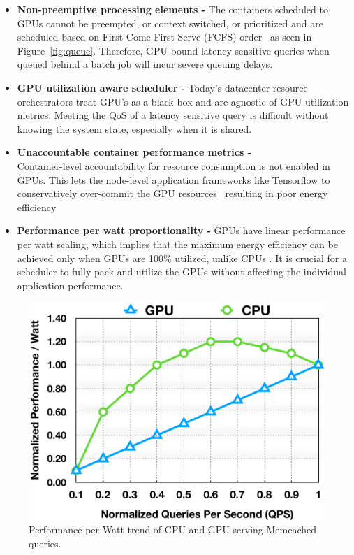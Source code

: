 \begin{itemize}[wide, nosep, labelindent = 0pt, topsep = 0.3ex]
\item \textbf{Non-preemptive processing elements -} The containers scheduled to GPUs cannot be preempted, or context switched, or prioritized and are scheduled based on First Come First Serve (FCFS) order~\cite{amert2017gpu} as seen in Figure~\ref{fig:queue}. Therefore, GPU-bound latency sensitive queries when queued behind a batch job will incur severe queuing delays.

\item \textbf{GPU utilization aware scheduler -} Today's datacenter resource orchestrators treat GPU's as a black box and are agnostic of GPU utilization metrics. Meeting the QoS of a latency sensitive query is difficult without knowing the system state, especially when it is shared.

\item \textbf{Unaccountable container performance metrics -} \\Container-level accountability for resource consumption is not enabled in GPUs. This lets the node-level application frameworks like Tensorflow to conservatively over-commit the GPU resources~\cite{tensorflowgpu} resulting in poor energy efficiency %
\item \textbf{Performance per watt proportionality -} GPUs have linear performance per watt scaling, which implies that the maximum energy efficiency can be achieved only when GPUs are 100\% utilized, unlike CPUs \cite{wong2016peak}. It is crucial for a scheduler to fully pack and utilize the GPUs without affecting the individual application performance.
\end{itemize}

\begin{figure}[!tbp]
\centering
  \includegraphics[width=.85\linewidth]{results/energy.pdf}
  \vspace{-2mm}
  \caption{Performance per Watt trend of CPU and GPU serving Memcached queries.}
  \vspace{-2mm}
  \label{fig:efficiency}
\end{figure}

